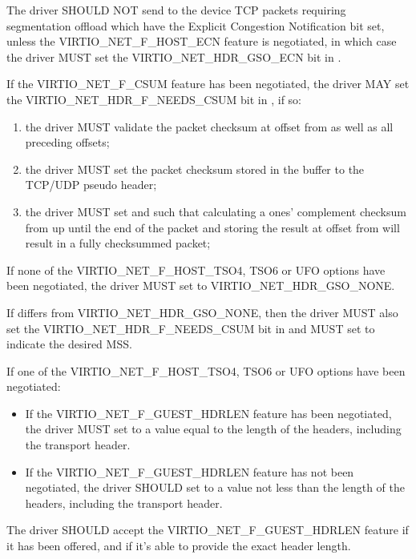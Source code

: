 The driver SHOULD NOT send to the device TCP packets requiring segmentation offload
which have the Explicit Congestion Notification bit set, unless the
VIRTIO_NET_F_HOST_ECN feature is negotiated, in which case the
driver MUST set the VIRTIO_NET_HDR_GSO_ECN bit in
.

If the VIRTIO_NET_F_CSUM feature has been negotiated, the
driver MAY set the VIRTIO_NET_HDR_F_NEEDS_CSUM bit in
, if so:
\begin{enumerate}
\item the driver MUST validate the packet checksum at
	offset  from  as well as all
	preceding offsets;
\item the driver MUST set the packet checksum stored in the
	buffer to the TCP/UDP pseudo header;
\item the driver MUST set  and
	 such that calculating a ones'
	complement checksum from  up until the end of
	the packet and storing the result at offset 
	from   will result in a fully checksummed
	packet;
\end{enumerate}

If none of the VIRTIO_NET_F_HOST_TSO4, TSO6 or UFO options have
been negotiated, the driver MUST set  to
VIRTIO_NET_HDR_GSO_NONE.

If  differs from VIRTIO_NET_HDR_GSO_NONE, then
the driver MUST also set the VIRTIO_NET_HDR_F_NEEDS_CSUM bit in
 and MUST set  to indicate the
desired MSS.

If one of the VIRTIO_NET_F_HOST_TSO4, TSO6 or UFO options have
been negotiated:
\begin{itemize}
\item If the VIRTIO_NET_F_GUEST_HDRLEN feature has been negotiated,
	the driver MUST set  to a value equal to the length
	of the headers, including the transport header.

\item If the VIRTIO_NET_F_GUEST_HDRLEN feature has not been negotiated,
	the driver SHOULD set  to a value
	not less than the length of the headers, including the transport
	header.
\end{itemize}

The driver SHOULD accept the VIRTIO_NET_F_GUEST_HDRLEN feature if it has
been offered, and if it's able to provide the exact header length.

